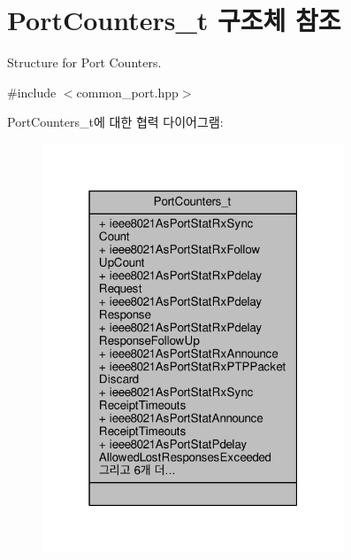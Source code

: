 \hypertarget{struct_port_counters__t}{}\section{Port\+Counters\+\_\+t 구조체 참조}
\label{struct_port_counters__t}


Structure for Port Counters.  




{\ttfamily \#include $<$common\+\_\+port.\+hpp$>$}



Port\+Counters\+\_\+t에 대한 협력 다이어그램\+:
\nopagebreak
\begin{figure}[H]
\begin{center}
\leavevmode
\includegraphics[width=256pt]{struct_port_counters__t__coll__graph}
\end{center}
\end{figure}
